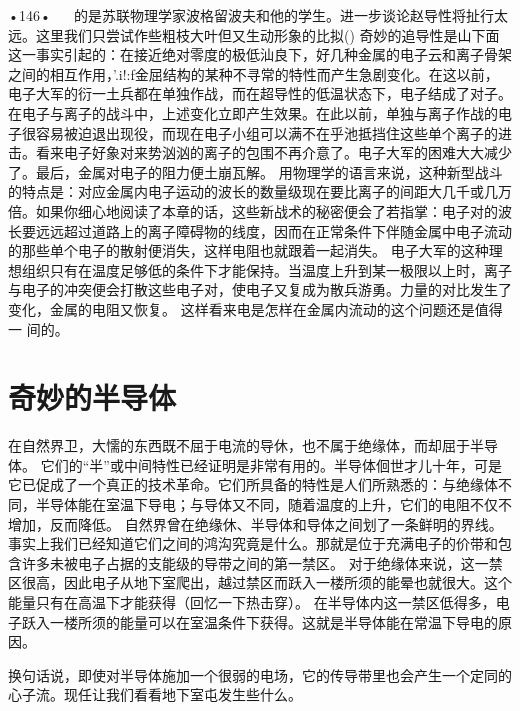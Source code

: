 {•146•
  
的是苏联物理学家波格留波夫和他的学生。进一步谈论赵导性将扯行太远。这里我们只尝试作些粗枝大叶但又生动形象的比拟()
奇妙的追导性是山下面这一事实引起的：在接近绝对零度的极低汕良下，好几种金属的电子云和离子骨架之间的相互作用，'.i!:f金屈结构的某种不寻常的特性而产生急剧变化。在这以前，电子大军的衍一土兵都在单独作战，而在超导性的低温状态下，电子结成了对子。
在电子与离子的战斗中，上述变化立即产生效果。在此以前，单独与离子作战的电子很容易被迫退出现役，而现在电子小组可以满不在乎池抵挡住这些单个离子的进击。看来电子好象对来势汹汹的离子的包围不再介意了。电子大军的困难大大减少了。最后，金属对电子的阻力便土崩瓦解。
用物理学的语言来说，这种新型战斗的特点是：对应金属内电子运动的波长的数量级现在要比离子的间距大几千或几万倍。如果你细心地阅读了本章的话，这些新战术的秘密便会了若指掌：电子对的波长要远远超过道路上的离子障碍物的线度，因而在正常条件下伴随金属中电子流动的那些单个电子的散射便消失，这样电阻也就跟着一起消失。
电子大军的这种理想组织只有在温度足够低的条件下才能保持。当温度上升到某一极限以上时，离子与电子的冲突便会打散这些电子对，使电子又复成为散兵游勇。力量的对比发生了变化，金属的电阻又恢复。
这样看来电是怎样在金属内流动的这个问题还是值得一 间的。


\section{奇妙的半导体}

在自然界卫，大懦的东西既不屈于电流的导休，也不属于绝缘体，而却屈于半导体。
它们的“半”或中间特性已经证明是非常有用的。半导体佪世才儿十年，可是它已促成了一个真正的技术革命。它们所具备的特性是人们所熟悉的：与绝缘体不同，半导体能在室温下导电；与导体又不同，随着温度的上升，它们的电阻不仅不增加，反而降低。
自然界曾在绝缘休、半导体和导体之间划了一条鲜明的界线。事实上我们已经知道它们之间的鸿沟究竟是什么。那就是位于充满电子的价带和包含许多未被电子占据的支能级的导带之间的第一禁区。
对于绝缘体来说，这一禁区很高，因此电子从地下室爬出，越过禁区而跃入一楼所须的能晕也就很大。这个能量只有在高温下才能获得（回忆一下热击穿）。
在半导体内这一禁区低得多，电子跃入一楼所须的能量可以在室温条件下获得。这就是半导体能在常温下导电的原因。

换句话说，即使对半导体施加一个很弱的电场，它的传导带里也会产生一个定同的心子流。现任让我们看看地下室屯发生些什么。

}
